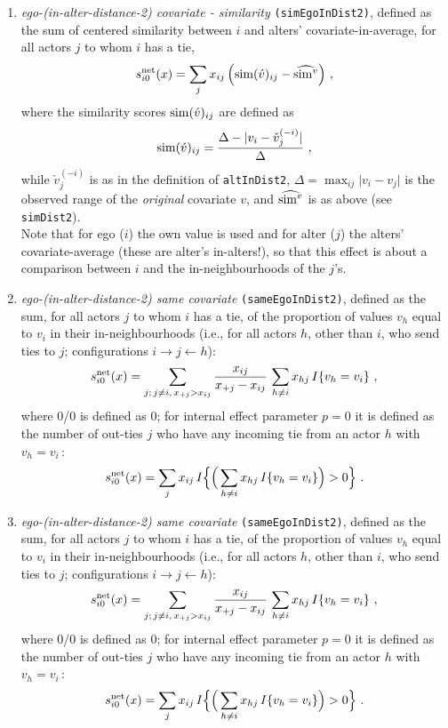 \documentclass[a4paper,fleqn,11pt]{article}
\newcommand{\+}{\, + \,}
\newcommand{\vit}{\theenumi}
\newcounter{savenumi}
\begin{document}
\begin{enumerate}
\item \emph{ego-(in-alter-distance-2) covariate - similarity} \texttt{(simEgoInDist2)},
      defined as the sum of centered similarity  between $i$
      and alters' covariate-in-average, for all actors
      $j$ to whom $i$ has a tie,
\[
 s^{\rm net}_{i\vit}(x) = \sum_j x_{ij}\, \Big({\rm sim}(\acute v)_{ij}
  - \widehat{{\rm sim}^v} \Big) \ ,
\]
 where the similarity scores ${\rm sim}(\acute v)_{ij}$ are defined as
\[
{\rm sim}(\acute v)_{ij}=
 \frac{\Delta-\vert  v_i - \check v_j^{(-i)} \vert}{\Delta} \ ,
\]
 while
 $ \check v_j^{(-i)}$ is as in the definition of \texttt{altInDist2},
 $\Delta=\max_{ij}\vert v_i - v_j \vert$ is the observed range of the
 \emph{original} covariate $v$, and $\widehat{{\rm sim}^v}$ is as above
 (see \texttt{simDist2}).\\
  Note that for ego ($i$) the own value is used and for alter ($j$) the alters' covariate-average
  (these are alter's in-alters!), so that this effect is about a comparison between $i$
   and the in-neighbourhoods of the $j$'s.

\item \emph{ego-(in-alter-distance-2) same covariate} \texttt{(sameEgoInDist2)},
      defined as the sum, for all actors $j$ to whom $i$ has a tie,
      of the proportion of values $v_h$ equal to $v_i$
      in their in-neighbourhoods (i.e., for all actors $h$, other than $i$,
       who send ties to $j$; configurations $i \rightarrow j \leftarrow h$):
\[
 s^{\rm net}_{i\vit}(x) = \sum_{j;\, j \neq i, \, x_{+j} > x_{ij} } \frac{x_{ij}}{x_{+j} - x_{ij}}
                        \, \sum_{h \neq i} x_{hj}\, I\{v_h = v_i\} \ ,
\]
where 0/0 is defined as 0; for internal effect parameter $p=0$ it is defined
as the number of out-ties $j$ who have any incoming tie from an actor $h$
with $v_h = v_i\,$:
\[
 s^{\rm net}_{i\vit}(x) = \sum_j x_{ij}\,
                I\Big\{  \Big( \sum_{h \neq i} x_{hj}\, I\{v_h = v_i\} \Big) > 0 \Big\} \ .
\]

\item \emph{ego-(in-alter-distance-2) same covariate} \texttt{(sameEgoInDist2)},
      defined as the sum, for all actors $j$ to whom $i$ has a tie,
      of the proportion of values $v_h$ equal to $v_i$
      in their in-neighbourhoods (i.e., for all actors $h$, other than $i$,
       who send ties to $j$; configurations $i \rightarrow j \leftarrow h$):
\[
 s^{\rm net}_{i\vit}(x) = \sum_{j;\, j \neq i, \, x_{+j} > x_{ij} } \frac{x_{ij}}{x_{+j} - x_{ij}}
                        \, \sum_{h \neq i} x_{hj}\, I\{v_h = v_i\} \ ,
\]
where 0/0 is defined as 0; for internal effect parameter $p=0$ it is defined
as the number of out-ties $j$ who have any incoming tie from an actor $h$
with $v_h = v_i\,$:
\[
 s^{\rm net}_{i\vit}(x) = \sum_j x_{ij}\,
                I\Big\{  \Big( \sum_{h \neq i} x_{hj}\, I\{v_h = v_i\} \Big) > 0 \Big\} \ .
\]

\setcounter{savenumi}{\value{enumi}}
\end{enumerate}
\end{document}
